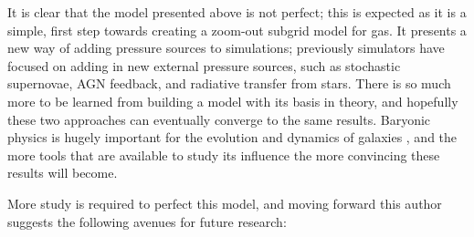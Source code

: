 It is clear that the model presented above is not perfect; this is expected as it is a simple, first step towards creating a zoom-out subgrid model for gas.
It presents a new way of adding pressure sources to simulations; previously simulators have focused on adding in new external pressure sources, such as stochastic supernovae, AGN feedback, and radiative transfer from stars.
There is so much more to be learned from building a model with its basis in theory, and hopefully these two approaches can eventually converge to the same results.
Baryonic physics is hugely important for the evolution and dynamics of galaxies \citep{vogelsberger_introducing_2014, schaye_eagle_2015}, and the more tools that are available to study its influence the more convincing these results will become.

More study is required to perfect this model, and moving forward this author suggests the following avenues for future research:

